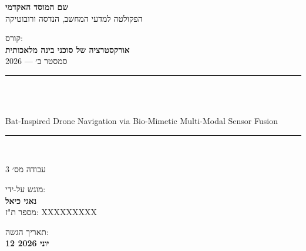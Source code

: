 \begin{titlepage}
    \centering
    \vspace*{1.5cm}

    {\large\textbf{שם המוסד האקדמי}}\\
    \vspace{0.3em}
    {\normalsize הפקולטה למדעי המחשב, הנדסה ורובוטיקה}\\
    \vspace{1.5cm}

    {\normalsize קורס:}\\
    \vspace{0.2em}
    {\large\textbf{אורקסטרציה של סוכני בינה מלאכותית}}\\
    \vspace{0.2em}
    {\normalsize סמסטר ב׳ --- 2026}\\
    \vspace{1.5cm}

    \rule{\linewidth}{1pt}\\
    \vspace{0.5cm}

    {\LARGE\bfseries {}}\\
    \vspace{0.4em}
    {\large\foreignlanguage{english}{Bat-Inspired Drone Navigation via Bio-Mimetic Multi-Modal Sensor Fusion}}\\
    \vspace{0.3em}

    \rule{\linewidth}{1pt}\\
    \vspace{1.5cm}

    {\large עבודה מס׳ 3}\\
    \vspace{2cm}

    {\normalsize מוגש על-ידי:}\\
    \vspace{0.5em}
    {\large\textbf{נאגי כיאל}}\\
    \vspace{0.2em}
    {\normalsize מספר ת"ז: XXXXXXXXX}\\
    \vspace{1cm}

    \vfill
    {\normalsize תאריך הגשה:}\\
    \vspace{0.2em}
    {\large\textbf{12 יוני 2026}}\\
    \vspace{1cm}
\end{titlepage}
